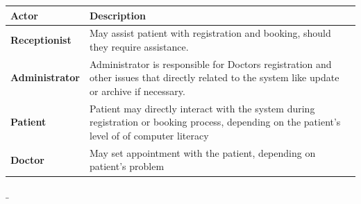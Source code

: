\documentclass[11 pt]{article}
\begin{document}
\begin{tabular}{|p{3cm}|p{9cm}|}
\hline
\textbf{Actor} & \textbf{Description}\\
\hline
\textbf{Receptionist} & May assist patient with registration and booking, should they require assistance.\\
\hline
\textbf{Administrator}& Administrator is responsible for Doctors registration and other issues that directly related to the system like update or archive if necessary.\\
\hline
\textbf{Patient}& Patient may directly interact with the system during registration or booking process, depending on the patient's level of of computer literacy\\
\hline
\textbf{Doctor}& May set appointment with the patient, depending on patient's problem \\
\hline

\end{tabular}
$\_$
\\\\\\
\end{document}
